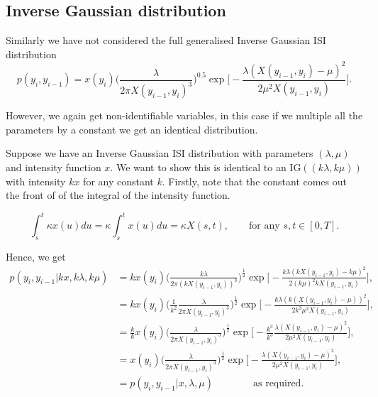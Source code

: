 \documentclass[../main.tex]{subfiles}
\begin{document}
 \subsection{Inverse Gaussian distribution}
 Similarly we have not considered the full generalised Inverse Gaussian ISI distribution
 \begin{equation}
 p(y_i, y_{i-1}) =  x(y_i) \bigg( \frac{\lambda}{2\pi X(y_{i-1} , y_i )^3} \bigg)^{0.5} \exp \bigg[-\frac{\lambda(X(y_{i-1} , y_i )-\mu)^2}{2 \mu ^2 X(y_{i-1} , y_i )} \bigg].
 \end{equation}
 
 However, we again get non-identifiable variables, in this case if we multiple all the parameters by a constant we get an identical distribution. \\
 
 {\color{blue}
 Suppose we have an Inverse Gaussian ISI distribution with parameters $(\lambda,\mu)$ and intensity function $x$. We want to show this is identical to an IG$((k\lambda,k\mu))$ with intensity $kx$ for any constant $k$. Firstly, note that the constant comes out the front of of the integral of the intensity function. 
 
    \begin{equation}
 \int^{t}_{s} \kappa x(u) du = \kappa \int^{t}_{s} x(u) du = \kappa X(s,t)  , \qquad \text{for any } s,t \in [0,T].
\end{equation}

Hence, we get
  \begin{align}
 p(y_i, y_{i-1}|kx,k\lambda,k\mu) &=  kx(y_i) \bigg( \frac{k\lambda}{2\pi (kX(y_{i-1} , y_i ))^3} \bigg)^{\frac{1}{2}} \exp \bigg[-\frac{k\lambda(kX(y_{i-1} , y_i )-k\mu)^2}{2 (k\mu) ^2 kX(y_{i-1} , y_i )} \bigg],\\
 &=  kx(y_i) \bigg( \frac{1}{k^2}\frac{\lambda}{2\pi X(y_{i-1} , y_i )^3} \bigg)^{\frac{1}{2}} \exp \bigg[-\frac{k\lambda(k(X(y_{i-1} , y_i )-\mu))^2}{2 k^3\mu ^2 X(y_{i-1} , y_i )} \bigg],\\
  &=  \frac{k}{k}x(y_i) \bigg(\frac{\lambda}{2\pi X(y_{i-1} , y_i )^3} \bigg)^{\frac{1}{2}} \exp \bigg[-\frac{k^3}{k^3}\frac{\lambda(X(y_{i-1} , y_i )-\mu)^2}{2\mu ^2 X(y_{i-1} , y_i )} \bigg],\\
 &=  x(y_i) \bigg( \frac{\lambda}{2\pi X(y_{i-1} , y_i )^3} \bigg)^{\frac{1}{2}} \exp \bigg[-\frac{\lambda(X(y_{i-1} , y_i )-\mu)^2}{2 \mu ^2 X(y_{i-1} , y_i )} \bigg],\\
 &= p(y_i, y_{i-1}|x,\lambda,\mu) \qquad \qquad \text{as required.}
 \end{align}
 }
 
\end{document}
